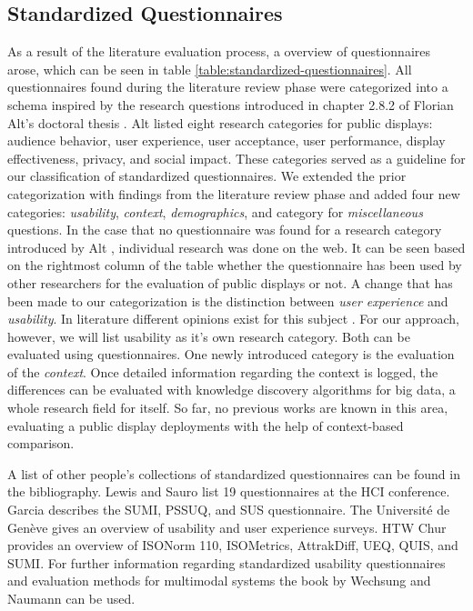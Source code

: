 \subsection{Standardized Questionnaires}
\label{section:questionnaires:categorization}


	As a result of the literature evaluation process, a overview of questionnaires arose, which can be seen in table \ref{table:standardized-questionnaires}. All questionnaires found during the literature review phase were categorized into a schema inspired by the research questions introduced in chapter 2.8.2 of Florian Alt's doctoral thesis \cite{alt2013thesis}. Alt listed eight research categories for public displays: audience behavior, user experience, user acceptance, user performance, display effectiveness, privacy, and social impact. These categories served as a guideline for our classification of standardized questionnaires. We extended the prior categorization with findings from the literature review phase and added four new categories: \textit{usability}, \textit{context}, \textit{demographics}, and category for \textit{miscellaneous} questions. In the case that no questionnaire was found for a research category introduced by Alt \cite{alt2013thesis}, individual research was done on the web. It can be seen based on the rightmost column of the table whether the questionnaire has been used by other researchers for the evaluation of public displays or not.
	A change that has been made to our categorization is the distinction between \textit{user experience} and \textit{usability}. In literature different opinions exist for this subject \cite{bevan2009difference}. For our approach, however, we will list usability as it's own research category. Both can be evaluated using questionnaires. 
	One newly introduced category is the evaluation of the \textit{context}. Once detailed information regarding the context is logged, the differences can be evaluated with knowledge discovery algorithms for big data, a whole research field for itself. So far, no previous works are known in this area, evaluating a public display deployments with the help of context-based comparison. 


	A list of other people's collections of standardized questionnaires can be found in the bibliography. Lewis and Sauro \cite{Lewis2013HCI} list 19 questionnaires at the HCI conference. Garcia \cite{Garcia2013UXResearch} describes the SUMI, PSSUQ, and SUS questionnaire. The Universit{\'e} de Gen{\`e}ve \cite{Geneve2014Wiki} gives an overview of usability and user experience surveys. HTW Chur \cite{Chur2014Questionnaires} provides an overview of ISONorm 110, ISOMetrics, AttrakDiff, UEQ, QUIS, and SUMI. For further information regarding standardized usability questionnaires and evaluation methods for multimodal systems the book by Wechsung and Naumann \cite{wechsung2008evaluation} can be used. 


